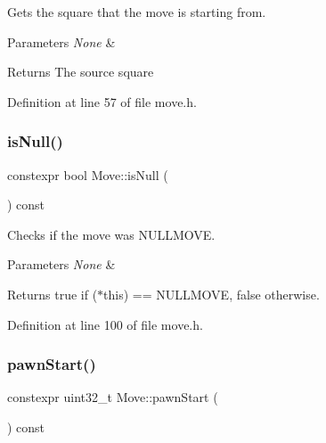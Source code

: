 Gets the square that the move is starting from. 


\begin{DoxyParams}{Parameters}
{\em None} & \\
\hline
\end{DoxyParams}
\begin{DoxyReturn}{Returns}
The source square 
\end{DoxyReturn}


Definition at line 57 of file move.\+h.

\mbox{\label{classMove_ac986baf2580e64f47828c8adf23a25f0}} 
\subsubsection{\texorpdfstring{is\+Null()}{isNull()}}
{\footnotesize\ttfamily constexpr bool Move\+::is\+Null (\begin{DoxyParamCaption}{ }\end{DoxyParamCaption}) const\hspace{0.3cm}{\ttfamily [inline]}}



Checks if the move was N\+U\+L\+L\+M\+O\+VE. 


\begin{DoxyParams}{Parameters}
{\em None} & \\
\hline
\end{DoxyParams}
\begin{DoxyReturn}{Returns}
true if ($\ast$this) == N\+U\+L\+L\+M\+O\+VE, false otherwise. 
\end{DoxyReturn}


Definition at line 100 of file move.\+h.

\mbox{\label{classMove_ae9eaee49438859900541d7a308161a8b}} 
\subsubsection{\texorpdfstring{pawn\+Start()}{pawnStart()}}
{\footnotesize\ttfamily constexpr uint32\+\_\+t Move\+::pawn\+Start (\begin{DoxyParamCaption}{ }\end{DoxyParamCaption}) const\hspace{0.3cm}{\ttfamily [inline]}}



